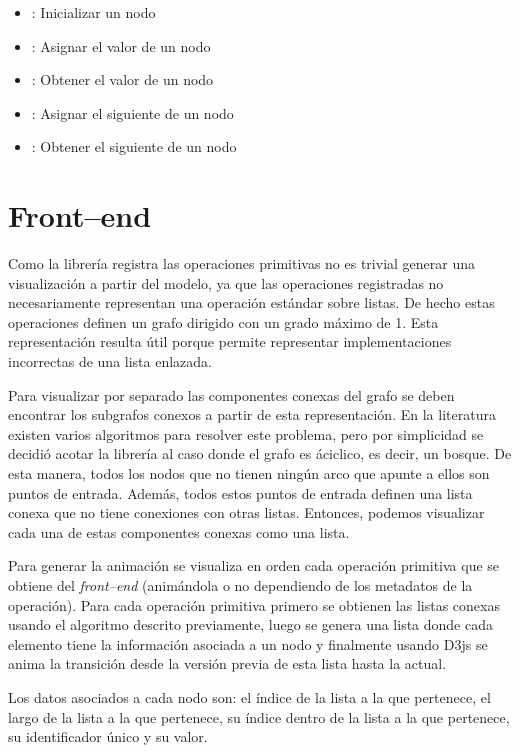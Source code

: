 \begin{itemize}
    \item{}: Inicializar un nodo
    \item{}: Asignar el valor de un nodo
    \item{}: Obtener el valor de un nodo
    \item{}: Asignar el siguiente de un nodo
    \item{}: Obtener el siguiente de un nodo
\end{itemize}

\section{Front--end}

Como la librería registra las operaciones primitivas no es trivial generar una visualización a partir del modelo, ya que las operaciones registradas no necesariamente representan una operación estándar sobre listas. De hecho estas operaciones definen un grafo dirigido con un grado máximo de 1. Esta representación resulta útil porque permite representar implementaciones incorrectas de una lista enlazada.

Para visualizar por separado las componentes conexas del grafo se deben encontrar los subgrafos conexos a partir de esta representación. En la literatura existen varios algoritmos para resolver este problema, pero por simplicidad se decidió acotar la librería al caso donde el grafo es áciclico, es decir, un bosque. De esta manera, todos los nodos que no tienen ningún arco que apunte a ellos son puntos de entrada. Además, todos estos puntos de entrada definen una lista conexa que no tiene conexiones con otras listas. Entonces, podemos visualizar cada una de estas componentes conexas como una lista.

Para generar la animación se visualiza en orden cada operación primitiva que se obtiene del \textit{front--end} (animándola o no dependiendo de los metadatos de la operación). Para cada operación primitiva primero se obtienen las listas conexas usando el algoritmo descrito previamente, luego se genera una lista donde cada elemento tiene la información asociada a un nodo y finalmente usando D3js se anima la transición desde la versión previa de esta lista hasta la actual.

Los datos asociados a cada nodo son: el índice de la lista a la que pertenece, el largo de la lista a la que pertenece, su índice dentro de la lista a la que pertenece, su identificador único y su valor.

